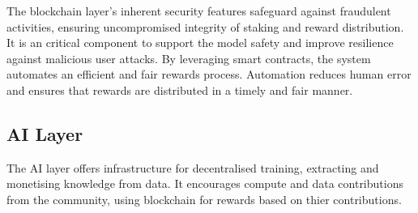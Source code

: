 \documentclass[conference]{IEEEtran}
\begin{document}
The blockchain layer's inherent security features safeguard against fraudulent activities, ensuring uncompromised integrity of staking and reward distribution. It is an critical component to support the model safety and improve resilience against malicious user attacks. By leveraging smart contracts, the system automates an efficient and fair rewards process. Automation reduces human error and ensures that rewards are distributed in a timely and fair manner. 

\subsection{AI Layer}













The AI layer offers infrastructure for decentralised training, extracting and monetising knowledge from data. It encourages compute and data contributions from the community, using blockchain for rewards based on thier contributions.
\end{document}

